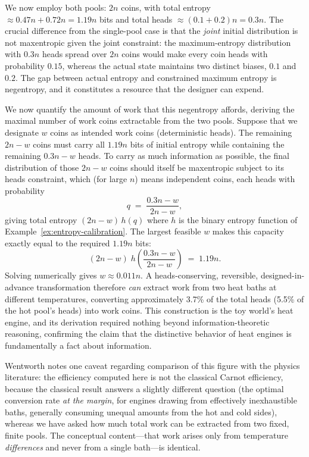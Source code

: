 \documentclass[10pt]{article}
\theoremstyle{definition}
\theoremstyle{remark}
\begin{document}
We now employ both pools: $2n$ coins, with total entropy $\approx 0.47n + 0.72n = 1.19n$ bits and total heads $\approx (0.1 + 0.2)n = 0.3n$. The crucial difference from the single-pool case is that the \emph{joint} initial distribution is not maxentropic given the joint constraint: the maximum-entropy distribution with $0.3n$ heads spread over $2n$ coins would make every coin heads with probability $0.15$, whereas the actual state maintains two distinct biases, $0.1$ and $0.2$. The gap between actual entropy and constrained maximum entropy is negentropy, and it constitutes a resource that the designer can expend.

We now quantify the amount of work that this negentropy affords, deriving the maximal number of work coins extractable from the two pools. Suppose that we designate $w$ coins as intended work coins (deterministic heads). The remaining $2n - w$ coins must carry all $1.19n$ bits of initial entropy while containing the remaining $0.3n - w$ heads. To carry as much information as possible, the final distribution of those $2n-w$ coins should itself be maxentropic subject to its heads constraint, which (for large $n$) means independent coins, each heads with probability
\[
q \;=\; \frac{0.3n - w}{2n - w},
\]
giving total entropy $(2n - w)\, h(q)$ where $h$ is the binary entropy function of Example~\ref{ex:entropy-calibration}. The largest feasible $w$ makes this capacity exactly equal to the required $1.19n$ bits:
\[
(2n - w)\; h\!\left(\frac{0.3n - w}{2n - w}\right) \;=\; 1.19n .
\]
Solving numerically gives $w \approx 0.011n$. A heads-conserving, reversible, designed-in-advance transformation therefore \emph{can} extract work from two heat baths at different temperatures, converting approximately 3.7\% of the total heads (5.5\% of the hot pool's heads) into work coins. This construction is the toy world's heat engine, and its derivation required nothing beyond information-theoretic reasoning, confirming the claim that the distinctive behavior of heat engines is fundamentally a fact about information.

Wentworth notes one caveat regarding comparison of this figure with the physics literature: the efficiency computed here is not the classical Carnot efficiency, because the classical result answers a slightly different question (the optimal conversion rate \emph{at the margin}, for engines drawing from effectively inexhaustible baths, generally consuming unequal amounts from the hot and cold sides), whereas we have asked how much total work can be extracted from two fixed, finite pools. The conceptual content---that work arises only from temperature \emph{differences} and never from a single bath---is identical.
\end{document}
